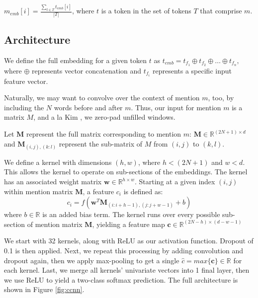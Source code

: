 \documentclass[11pt,a4paper]{article}
\begin{document}
$m_{emb}[i] = \frac{\sum_{t \in T}t_{emb}[i]}{|T|}$, where $t$ is a token in the set of tokens $T$ that comprise $m$.

\subsection{Architecture}
We define the full embedding for a given token $t$ as $t_{emb} = t_{f_{1}} \oplus t_{f_{2}} \oplus \ldots \oplus t_{f_{n}},$ where $\oplus$ represents vector concatenation and $t_{f_{i}}$ represents a specific input feature vector.

Naturally, we may want to convolve over the context of mention $m$, too, by including the $N$ words before and after $m$.  Thus, our input for mention $m$ is a matrix $M$, and a la Kim , we zero-pad unfilled windows.

\vspace{3mm}

Let $\textbf{M}$ represent the full matrix corresponding to mention $m$: $\textbf{M} \in \mathbb{R}^{(2N+1) \times d}$ and $\textbf{M}_{(i,j),(k:l)}$ represent the sub-matrix of $M$ from $(i,j)$ to $(k,l)$.

\vspace{3mm}

We define a kernel with dimensions $(h,w)$, where $h < (2N+1)$ and $w < d$.  This allows the kernel to operate on sub-sections of the embeddings.  The kernel has an associated weight matrix $\textbf{w} \in \mathbb{R}^{h \times w}$.  Starting at a given index $(i,j)$ within mention matrix $\textbf{M}$, a feature $c_{i}$ is defined as:
\begin{equation}
c_{i} = f(\textbf{w}^{T}\textbf{M}_{(i:i+h-1),(j:j+w-1)} + b)
\end{equation}
where $b \in \mathbb{R}$ is an added bias term.  The kernel runs over every possible sub-section of mention matrix $\textbf{M}$, yielding a feature map $\textbf{c} \in \mathbb{R}^{(2N-h) \times (d-w-1)}$

\vspace{3mm}

We start with 32 kernels, along with ReLU as our activation function.  Dropout of 0.1 is then applied.  Next, we repeat this processing by adding convolution and dropout again, then we apply max-pooling to get a single $\hat{c} = max\{\textbf{c\}} \in \mathbb{R}$ for each kernel. Last, we merge all kernels' univariate vectors into 1 final layer, then we use ReLU to yield a two-class softmax prediction.  The full architecture is shown in Figure \ref{fig:ccnn}.
\end{document}
